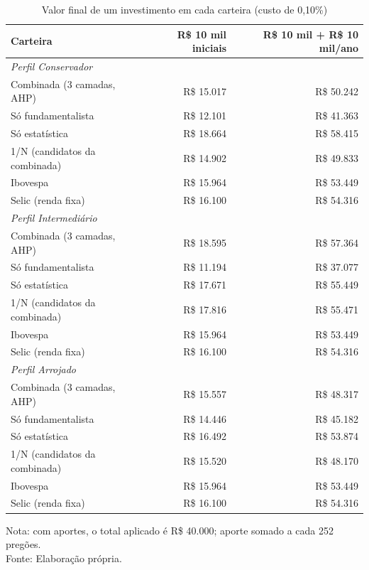 \begin{table}[htbp]
\centering
\caption{Valor final de um investimento em cada carteira (custo de 0,10\%)}
\label{tab:patrimonio}
\footnotesize
\begin{tabular}{lrr}
\toprule
\textbf{Carteira} & \textbf{R\$ 10 mil iniciais} & \textbf{R\$ 10 mil + R\$ 10 mil/ano} \\
\midrule
\multicolumn{3}{l}{\textit{Perfil Conservador}} \\
Combinada (3 camadas, AHP) & R\$ 15.017 & R\$ 50.242 \\
Só fundamentalista & R\$ 12.101 & R\$ 41.363 \\
Só estatística & R\$ 18.664 & R\$ 58.415 \\
1/N (candidatos da combinada) & R\$ 14.902 & R\$ 49.833 \\
Ibovespa & R\$ 15.964 & R\$ 53.449 \\
Selic (renda fixa) & R\$ 16.100 & R\$ 54.316 \\
\midrule
\multicolumn{3}{l}{\textit{Perfil Intermediário}} \\
Combinada (3 camadas, AHP) & R\$ 18.595 & R\$ 57.364 \\
Só fundamentalista & R\$ 11.194 & R\$ 37.077 \\
Só estatística & R\$ 17.671 & R\$ 55.449 \\
1/N (candidatos da combinada) & R\$ 17.816 & R\$ 55.471 \\
Ibovespa & R\$ 15.964 & R\$ 53.449 \\
Selic (renda fixa) & R\$ 16.100 & R\$ 54.316 \\
\midrule
\multicolumn{3}{l}{\textit{Perfil Arrojado}} \\
Combinada (3 camadas, AHP) & R\$ 15.557 & R\$ 48.317 \\
Só fundamentalista & R\$ 14.446 & R\$ 45.182 \\
Só estatística & R\$ 16.492 & R\$ 53.874 \\
1/N (candidatos da combinada) & R\$ 15.520 & R\$ 48.170 \\
Ibovespa & R\$ 15.964 & R\$ 53.449 \\
Selic (renda fixa) & R\$ 16.100 & R\$ 54.316 \\
\bottomrule
\end{tabular}

\vspace{0.2cm}
\small Nota: com aportes, o total aplicado é R\$ 40.000; aporte somado a cada 252 pregões.\\
Fonte: Elaboração própria.
\end{table}
